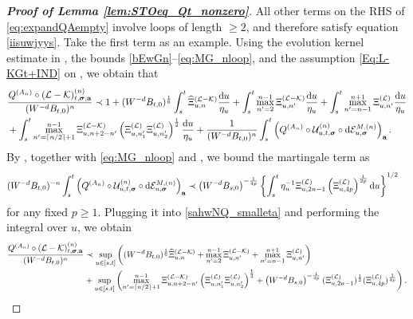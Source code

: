 \begin{proof}[\bf Proof of Lemma \ref{lem:STOeq_Qt_nonzero}]
All other terms on the RHS of \eqref{eq:expandQAempty} involve loops of length $\ge 2$, and therefore satisfy equation \eqref{iisuwjyys}.
Take the first term as an example. Using the evolution kernel estimate in , the bounds \eqref{bEwGn}--\eqref{eq:MG_nloop}, and the assumption \eqref{Eq:L-KGt+IND} on , we obtain that
\begin{align}\label{sahwNQ_smalleta}
&\frac{ Q^{(A_n)}\circ (\mathcal{L} - \mathcal{K})^{(n)}_{t, {\boldsymbol{\sigma}}, {\mathbf{a}}}}{(W^{-d}B_{t,0})^{n}} \prec 
1 + (W^{-d}B_{t,0})^{\frac{1}{6}} \int_{s}^t   \widehat\Xi^{({\mathcal L-\mathcal K})}_{u,n} \frac{\mathrm{d} u}{\eta_u} +   \int_{s}^t  \max_{n'=2}^{n-1} \Xi^{({\mathcal L-\mathcal K})}_{u,n'}\frac{\mathrm{d} u}{\eta_u}  + \int_{s}^t \max_{n'=n-1}^{n+1} \Xi^{(\mathcal L)}_{u,n'}\frac{\mathrm{d} u}{\eta_u}    \nonumber \\
&+  \int_{s}^t \max_{n'=\lceil n/2\rceil + 1}^{n-1} \Xi^{({\mathcal L-\mathcal K})}_{u,n+2-n'} \left({\Xi^{({\mathcal L})}_{u,n_1'} \Xi^{(\mathcal L)}_{u,n_2'}}\right)^{\frac 12 } \frac{\mathrm{d} u}{\eta_u}   + \frac{1}{(W^{-d}B_{t,0})^{n}} \int_{s}^t \left(Q^{(A_n)}\circ \mathcal{U}^{(n)}_{u, t, {\boldsymbol{\sigma}}} \circ  \mathrm{d}  \mathcal{E}^{M,(n)}_{u, {\boldsymbol{\sigma}}}\right)_{{\mathbf{a}}}.
\end{align}
By , together with \eqref{eq:MG_nloop} and , we bound the martingale term as  
\begin{align} \label{sahwNQ2}
(W^{-d}B_{t,0})^{-n} \int_{s}^t \left(Q^{(A_n)}\circ \mathcal{U}^{(n)}_{u, t, {\boldsymbol{\sigma}}} \circ  \mathrm{d}  \mathcal{E}^{M,(n)}_{u, {\boldsymbol{\sigma}}}\right)_{{\mathbf{a}}}&\prec \left({W^{-d}B_{s,0}}\right)^{-\frac{1}{4p}}\left\{\int_{s}^t 
   \eta_u^{-1}\Xi^{(\mathcal L)}_{u, {2n-1}}\left({\Xi^{(\mathcal L)}_{u, 4p}}\right)^{\frac{1}{2p}}\mathrm{d} u\right\}^{1/2} 
  \end{align} 
for any fixed $p\ge 1$. Plugging it into \eqref{sahwNQ_smalleta} and performing the integral over $u$, we obtain 
\begin{align}\label{am;asoiuw_smalleta}
\frac{ Q^{(A_n)}\circ (\mathcal{L} - \mathcal{K})^{(n)}_{t, \bsig, \ba}}{(W^{-d}B_{t,0})^{n}} &\prec \sup_{u\in [s,t]}
  \left((W^{-d}B_{t,0})^{\frac{1}{6}}\wh\Xi^{(\cal L-\cK)}_{u, n}+ \max_{n'=2}^{n-1} \Xi^{({\cal L-\cal K})}_{u,n'}+ \max_{n'=n-1}^{n+1} \Xi^{({\cal L})}_{u,n'} \right)\\
&+\sup_{u\in [s,t]}
  \left(\max_{n'=\lceil n/2\rceil + 1}^{n-1} \Xi^{({\cal L-\cal K})}_{u,n+2-n'} \p{\Xi^{({\cal L})}_{u,n_1'} \Xi^{({\cal L})}_{u,n_2'}}^{\frac 12 } +\p{W^{-d}B_{s,0}}^{-\frac{1}{4p}}(\Xi^{(\cal L)}_{u, {2n-1}})^{\frac 1 2}(\Xi^{(\cal L)}_{u, 4p})^{\frac{1}{4p}}\right).\nonumber

\end{align}
\end{proof}
